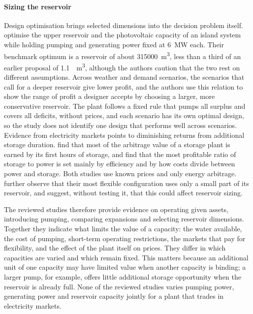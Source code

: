 \paragraph{Sizing the reservoir}
Design optimisation brings selected dimensions into the decision problem
itself. \citet{zisos2023mixing} optimise the upper reservoir and the
photovoltaic capacity of an island system while holding pumping and
generating power fixed at \SI{6}{\mega\watt} each. Their benchmark
optimum is a reservoir of about \SI{315000}{\cubic\metre}, less than a
third of an earlier proposal of \SI{1.1}{\mega\cubic\metre}, although
the authors caution that the two rest on different assumptions. Across
weather and demand scenarios, the scenarios that call for a deeper
reservoir give lower profit, and the authors use this relation to show
the range of profit a designer accepts by choosing a larger, more
conservative reservoir. The plant follows a fixed rule that pumps all
surplus and covers all deficits, without prices, and each scenario has
its own optimal design, so the study does not identify one design that
performs well across scenarios. Evidence from electricity markets points
to diminishing returns from additional storage duration.
\citet{sioshansi2009estimating} find that most of the arbitrage value of
a storage plant is earned by its first hours of storage, and
\citet{bradbury2014economic} find that the most profitable ratio of
storage to power is set mainly by efficiency and by how costs divide
between power and storage. Both studies use known prices and only
energy arbitrage. \citet{chazarra2017} further observe that their most
flexible configuration uses only a small part of its reservoir, and
suggest, without testing it, that this could affect reservoir sizing.

The reviewed studies therefore provide evidence on operating given
assets, introducing pumping, comparing expansions and selecting
reservoir dimensions. Together they indicate what limits the value of a
capacity: the water available, the cost of pumping, short-term
operating restrictions, the markets that pay for flexibility, and the
effect of the plant itself on prices. They differ in which capacities
are varied and which remain fixed. This matters because an additional
unit of one capacity may have limited value when another capacity is
binding; a larger pump, for example, offers little additional storage
opportunity when the reservoir is already full. None of the reviewed
studies varies pumping power, generating power and reservoir capacity
jointly for a plant that trades in electricity markets.

